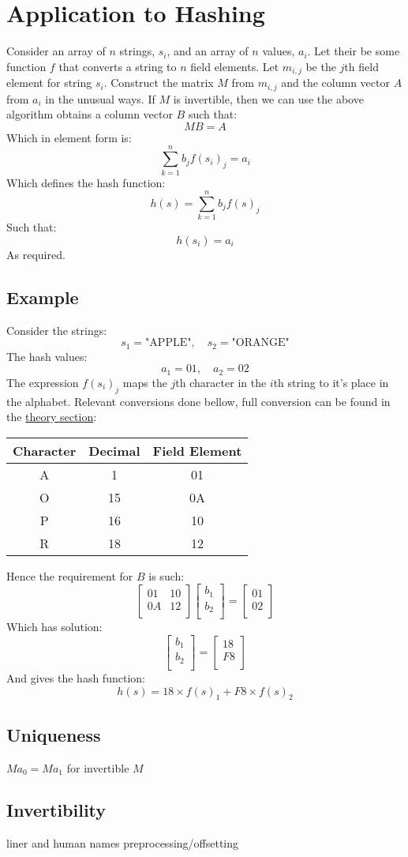 \section{Application to Hashing}
Consider an array of $n$ strings, $s_i$, and an array of $n$ values, $a_i$.
Let their be some function $f$ that converts a string to $n$ field elements.
Let $m_{i,j}$ be the $j$th field element for string $s_i$.
Construct the matrix $M$ from $m_{i,j}$ and the column vector $A$ from $a_i$ in the unusual ways.
If $M$ is invertible, then we can use the above algorithm obtains a column vector $B$ such that:
\[MB = A\]
Which in element form is:
\[\sum_{k=1}^nb_jf(s_i)_j = a_i\]
Which defines the hash function:
\[h(s)=\sum_{k=1}^nb_jf(s)_j\]
Such that:
\[h(s_i) = a_i\]
As required.

\subsection{Example}
Consider the strings:
\[s_1 = \text{"APPLE"},\quad s_2 = \text{"ORANGE"} \]
The hash values:
\[a_1 = 01,\quad a_2 = 02\]
The expression $f(s_i)_j$ maps the $j$th character in the $i$th string to it's place in the alphabet.
Relevant conversions done bellow,
full conversion can be found in the \hyperref[theory:byte]{theory section}:

\begin{center}
\begin{tabular}{|c|c|c|}
	\hline
	Character & Decimal & Field Element \\	
	\hline
	A &  1 & 01 \\
	O & 15 & 0A \\
	P & 16 & 10 \\
	R & 18 & 12 \\
	\hline
\end{tabular}
\end{center}

Hence the requirement for $B$ is such:
\[ 
\begin{bmatrix}
	01&10\\
	0A&12\\
\end{bmatrix}
\begin{bmatrix}
	b_1 \\ b_2\\
\end{bmatrix}
=
\begin{bmatrix}
	01\\ 02 \\
\end{bmatrix}
\]
Which has solution:
\[
\begin{bmatrix}
	b_1 \\ b_2\\
\end{bmatrix}
=
\begin{bmatrix}
	18\\F8 \\
\end{bmatrix}
\]
And gives the hash function:
\[h(s) = 18\times f(s)_1+F8\times f(s)_2\]

\subsection{Uniqueness}
$Ma_0 = Ma_1$ for invertible $M$

\subsection{Invertibility}
liner and human names
preprocessing/offsetting
